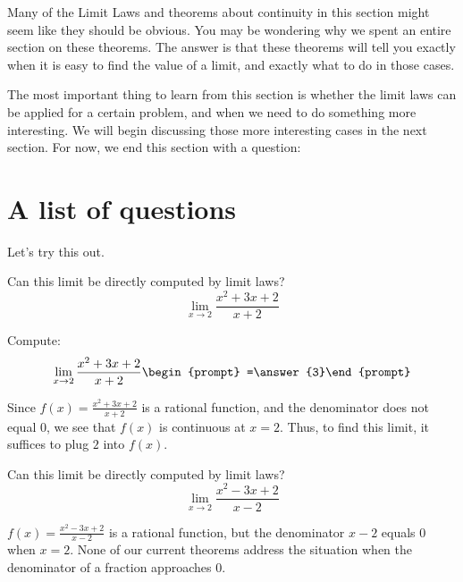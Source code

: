 \documentclass{ximera}
\begin{document}
Many of the Limit Laws and theorems about continuity in this section
might seem like they should be obvious.  You may be wondering why we
spent an entire section on these theorems.  The answer is that these
theorems will tell you exactly when it is easy to find the value of a
limit, and exactly what to do in those cases.

The most important thing to learn from this section is whether the
limit laws can be applied for a certain problem, and when we need to
do something more interesting.  We will begin discussing those more
interesting cases in the next section.  For now, we end this section
with a question:

\section{A list of questions}

Let's try this out.

\begin{question}
  Can this limit be directly computed by limit laws?
  \[
  \lim_{x\to 2}\frac{x^2+3x+2}{x+2} 
  \]
  \begin{multipleChoice}
  \end{multipleChoice}
  \begin{question}
    Compute:
    \[
    \lim_{x\to 2}\frac{x^2+3x+2}{x+2}\begin{prompt} =\answer{3}\end{prompt}
    \]
    \begin{feedback}
      Since $f(x)=\frac{x^2+3x+2}{x+2}$ is a rational function, and
      the denominator does not equal $0$, we see that $f(x)$ is
      continuous at $x=2$.  Thus, to find this limit, it suffices to
      plug $2$ into $f(x)$.
    \end{feedback}
  \end{question}
\end{question}


\begin{question}
  Can this limit be directly computed by limit laws?
  \[
  \lim_{x\to 2}\frac{x^2-3x+2}{x-2}
  \]
  \begin{multipleChoice}
  \end{multipleChoice}
  \begin{feedback}
    $f(x) = \frac{x^2-3x+2}{x-2}$ is a rational function, but the
    denominator $x-2$ equals $0$ when $x=2$. None of our current
    theorems address the situation when the denominator of a fraction
    approaches $0$.
  \end{feedback}
\end{question}
\end{document}
